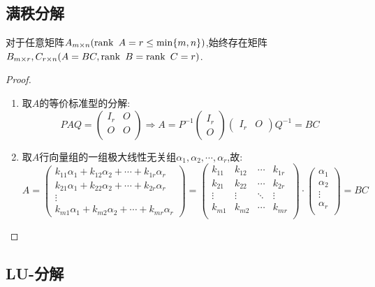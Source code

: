 \documentclass[UTF8,a4paper,notitlepage]{book}
\begin{document}
        \subsection{满秩分解}
        对于任意矩阵$A_{m\times n}(\operatorname{rank}~A=r\leq\min\{m,n\})$,始终存在矩阵$B_{m\times r},C_{r\times n}(A=BC,\operatorname{rank}~B=\operatorname{rank}~C=r)$.
        \begin{proof}\mbox{}\begin{enumerate}
            \item 取$A$的等价标准型的分解:$$PAQ=\begin{pmatrix} I_r&O\\ O&O\\ \end{pmatrix}\Rightarrow 
            A=P^{-1}\begin{pmatrix} I_r\\ O \end{pmatrix}\begin{pmatrix} I_r&O \end{pmatrix}Q^{-1}=BC$$
            \item 取$A$行向量组的一组极大线性无关组$\alpha_1,\alpha_2,\cdots,\alpha_r$,故:
            $$A=\begin{pmatrix} k_{11}\alpha_1+k_{12}\alpha_2+\cdots+k_{1r}\alpha_r\\ k_{21}\alpha_1+k_{22}\alpha_2+\cdots+k_{2r}\alpha_r\\ \vdots \\ k_{m1}\alpha_1+k_{m2}\alpha_2+\cdots+k_{mr}\alpha_r \end{pmatrix}
            =\begin{pmatrix} k_{11}&k_{12}&\cdots&k_{1r}\\ k_{21}&k_{22}&\cdots&k_{2r}\\ \vdots&\vdots&\ddots&\vdots \\ k_{m1}&k_{m2}&\cdots &k_{mr}\\ \end{pmatrix}
            \cdot \begin{pmatrix} \alpha_1\\ \alpha_2\\ \vdots \\ \alpha_r \\ \end{pmatrix}
            =BC$$
        \end{enumerate}\end{proof}
        \subsection{LU-分解}%
\end{document}
